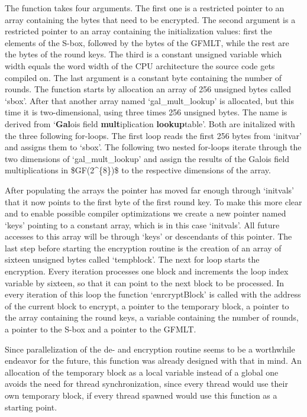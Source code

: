 The function takes four arguments. The first one is a restricted pointer
to an array containing the bytes that need to be encrypted. The second
argument is a restricted pointer to an array containing the
initialization values: first the elements of the S-box, followed by the
bytes of the \ac{GFMLT}, while the rest are the bytes of the round keys. The
third is a constant unsigned variable which width equals the word width
of the \ac{CPU} architecture the source code gets compiled on. The last
argument is a constant byte containing the number of rounds. The
function starts by allocation an array of 256 unsigned bytes called
`sbox'. After that another array named `gal\_mult\_lookup' is allocated,
but this time it is two-dimensional, using three times 256 unsigned
bytes. The name is derived from `\textbf{Gal}ois field
\textbf{mult}iplication \textbf{lookup}table'. Both are initalized with
the three following for-loops. The first loop reads the first 256 bytes
from `initvar' and assigns them to `sbox'. The following two nested
for-loops iterate through the two dimensions of `gal\_mult\_lookup' and
assign the results of the Galois field multiplications in \ac{$GF(2^{8})$} to the
respective dimensions of the array.

After populating the arrays the pointer has moved far enough through
`initvals' that it now points to the first byte of the first round key.
To make this more clear and to enable possible compiler optimizations we
create a new pointer named `keys' pointing to a constant array, which is
in this case `initvals'. All future accesses to this array will be
through `keys' or descendants of this pointer. The last step before
starting the encryption routine is the creation of an array of sixteen
unsigned bytes called `tempblock'. The next for loop starts the
encryption. Every iteration processes one block and increments the loop
index variable by sixteen, so that it can point to the next block to be
processed. In every iteration of this loop the function `enrcryptBlock'
is called with the address of the current block to encrypt, a pointer to
the temporary block, a pointer to the array containing the round keys, a
variable containing the number of rounds, a pointer to the S-box and a
pointer to the \ac{GFMLT}.

Since parallelization of the de- and encryption routine seems to be a
worthwhile endeavor for the future, this function was already designed
with that in mind. An allocation of the temporary block as a local
variable instead of a global one avoids the need for thread
synchronization, since every thread would use their own temporary block,
if every thread spawned would use this function as a starting point.
